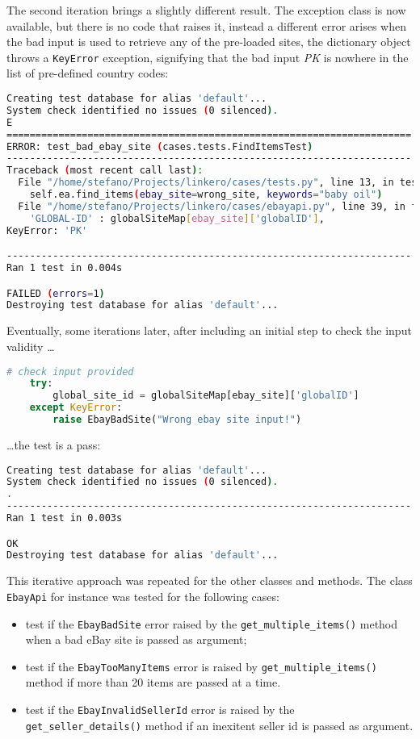 The second iteration brings a slightly different result. The exception class is
now available, but there is no code that raises it, instead a different error
arises when the bad input is used to retrieve any of the pre-loaded sites, the
dictionary object throws a \texttt{KeyError} exception, signifying that the
bad input \emph{PK} is nowhere in the list of pre-defined country codes:
\begin{lstlisting}[language=bash, breaklines=true]
Creating test database for alias 'default'...
System check identified no issues (0 silenced).
E
======================================================================
ERROR: test_bad_ebay_site (cases.tests.FindItemsTest)
----------------------------------------------------------------------
Traceback (most recent call last):
  File "/home/stefano/Projects/linkero/cases/tests.py", line 13, in test_bad_ebay_site
    self.ea.find_items(ebay_site=wrong_site, keywords="baby oil")
  File "/home/stefano/Projects/linkero/cases/ebayapi.py", line 39, in find_items
    'GLOBAL-ID' : globalSiteMap[ebay_site]['globalID'],
KeyError: 'PK'

----------------------------------------------------------------------
Ran 1 test in 0.004s

FAILED (errors=1)
Destroying test database for alias 'default'...
\end{lstlisting}

Eventually, some iterations later, after including an initial step to check the
input validity \ldots
\begin{lstlisting}[language=Python, breaklines=true]
    # check input provided
    try:
        global_site_id = globalSiteMap[ebay_site]['globalID']
    except KeyError:
        raise EbayBadSite("Wrong ebay site input!")
\end{lstlisting}

\ldots the test is a pass:
\begin{lstlisting}[language=bash, breaklines=true]
Creating test database for alias 'default'...
System check identified no issues (0 silenced).
.
----------------------------------------------------------------------
Ran 1 test in 0.003s

OK
Destroying test database for alias 'default'...
\end{lstlisting}

This iterative approach was repeated for the other classes and methods. The
class \texttt{EbayApi} for instance was tested for the following cases:
\begin{itemize}
  \item test if the \texttt{EbayBadSite} error raised by the
  \texttt{get\_multiple\_items()} method when a bad eBay site is passed as
  argument;
  \item test if the \texttt{EbayTooManyItems} error is raised by
  \texttt{get\_multiple\_items()} method if more than 20 items are passed at a
  time.
  \item test if the \texttt{EbayInvalidSellerId} error is raised by the
  \texttt{get\_seller\_details()} method if an inexitent seller id is passed as
  argument.
\end{itemize}

